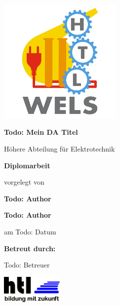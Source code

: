 \begin{center}
\begin{center}
\includegraphics[width=6cm]{img/HTLLogo.png}
\end{center}

\begin{center}
\Huge{\textbf{
Todo: Mein DA Titel
}}
\end{center}
\bigskip


\begin{center}
\Large{Höhere Abteilung für Elektrotechnik}
\end{center}


\begin{center}
\textbf{\LARGE{Diplomarbeit}}
\end{center}

\bigskip

\begin{center}
\large{vorgelegt von}
\end{center}

\begin{center}
\Large{\textbf{Todo: Author}} \bigskip

\Large{\textbf{Todo: Author}} \bigskip
\end{center}

\begin{center}
\Large{am Todo: Datum}
\end{center}

\bigskip

\bigskip

\bigskip

\bigskip

\begin{flushleft}
\tab[3cm]\large{\textbf{Betreut durch:}}

\bigskip
\tab[4cm] \large{Todo: Betreuer}

\bigskip
\end{flushleft}

\end{center}

\bigskip

\begin{center}
\includegraphics[width=3cm]{img/HTLLogo2.png}
\end{center}
